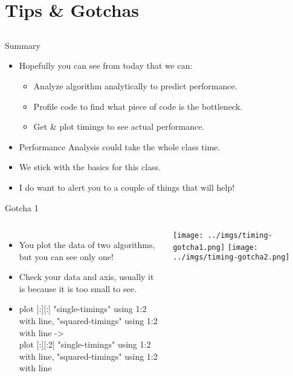 \documentclass{beamer}
\begin{document}
\section{Tips \& Gotchas}
\subsection{}

\begin{frame}{Summary}
\begin{itemize}
\item Hopefully you can see from today that we can:
\begin{itemize}
\item Analyze algorithm analytically to predict performance.
\item Profile code to find what piece of code is the bottleneck.
\item Get \& plot timings to see actual performance.
\end{itemize}
\item Performance Analysis could take the whole class time.
\item We stick with the basics for this class.
\item I do want to alert you to a couple of things that will help!
\end{itemize}
\end{frame}

\begin{frame}{Gotcha 1}
\begin{columns}
\begin{itemize}
\item You plot the data of two algorithms, but you can see only one!
\item <2-> Check your data and axis, usually it is because it is too small to see.
\item <3-> {\tiny plot [:][:] "single-timings" using 1:2 with line, "squared-timings" using 1:2 with line -> \\
plot [:][:2] "single-timings" using 1:2 with line, "squared-timings" using 1:2 with line }

\end{itemize}
 {
\texttt{[image: ../imgs/timing-gotcha1.png]}
}
 {
\texttt{[image: ../imgs/timing-gotcha2.png]}
}
\end{columns}
\end{frame}
\end{document}
